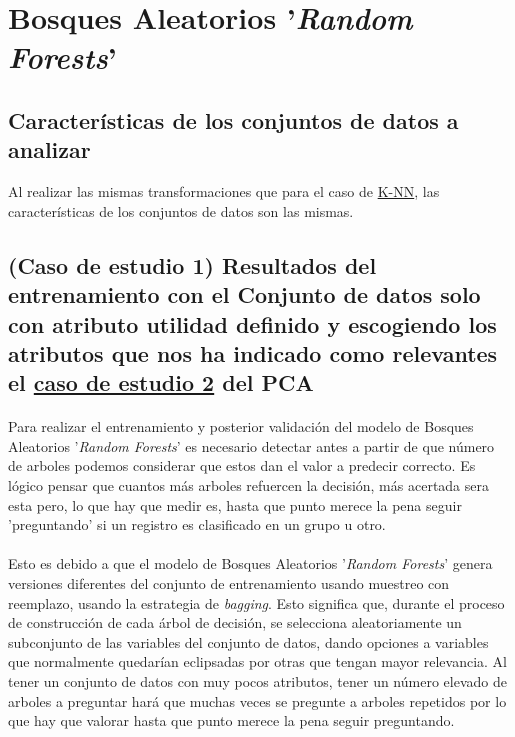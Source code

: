 \section{Bosques Aleatorios '\textit{Random Forests}'}
\label{resultados:rf}

\subsection{Características de los conjuntos de datos a analizar}
\label{resultados:rf_caracteristicas}
Al realizar las mismas transformaciones que para el caso de \hyperref[resultados:knn_caracteristicas]{K-NN}, las características de los conjuntos de datos son las mismas.

\subsection{(Caso de estudio 1) Resultados del entrenamiento con el Conjunto de datos solo con atributo utilidad definido y escogiendo los atributos que nos ha indicado como relevantes el \hyperref[result:pca_case2]{caso de estudio 2} del PCA}

\paragraph{}
Para realizar el entrenamiento y posterior validación del modelo de Bosques Aleatorios '\textit{Random Forests}' es necesario detectar antes a partir de que número de arboles podemos considerar que estos dan el valor a predecir correcto. Es lógico pensar que cuantos más arboles refuercen la decisión, más acertada sera esta pero, lo que hay que medir es, hasta que punto merece la pena seguir 'preguntando' si un registro es clasificado en un grupo u otro.

\paragraph{}
Esto es debido a que el modelo de Bosques Aleatorios '\textit{Random Forests}'\cite{ref:rf_def} genera versiones diferentes del conjunto de entrenamiento usando muestreo con reemplazo, usando la estrategia de \textit{bagging}\cite{ref:rf_bagging}. Esto significa que, durante el proceso de construcción de cada árbol de decisión, se selecciona aleatoriamente un subconjunto de las variables del conjunto de datos, dando opciones a variables que normalmente quedarían eclipsadas por otras que tengan mayor relevancia. Al tener un conjunto de datos con muy pocos atributos, tener un número elevado de arboles a preguntar hará que muchas veces se pregunte a arboles repetidos por lo que hay que valorar hasta que punto merece la pena seguir preguntando.

